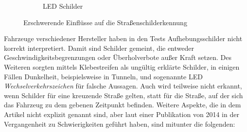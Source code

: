 \begin{figure}[H]
\begin{subfigure}[b]{0.125\textwidth}
    \caption{LED Schilder}
    \label{fig:ledschild}
   \end{subfigure}
      \caption{Erschwerende Einflüsse auf die Straßenschilderkennung}
      \label{fig:einfluesse-strscherkennung}
\end{figure}

Fahrzeuge verschiedener Hersteller haben in den Tests Aufhebungsschilder nicht korrekt interpretiert. Damit sind Schilder gemeint, die entweder Geschwindigkeitsbegrenzungen oder Überholverbote außer Kraft setzen. Des Weiteren sorgten mittels Klebestreifen als ungültig erklärte Schilder, in einigen Fällen Dunkelheit, beispielsweise in Tunneln, und sogenannte LED \emph{Wechselverkehrszeichen} für falsche Aussagen. Auch wird teilweise nicht erkannt, wenn Schilder für eine kreuzende Straße gelten, statt für die Straße, auf der sich das Fahrzeug zu dem gebenen Zeitpunkt befinden. Weitere Aspekte, die in dem Artikel nicht explizit genannt sind, aber laut einer Publikation von 2014 in der Vergangenheit zu Schwierigkeiten geführt haben, sind mitunter die folgenden: \cite{traffic-sign-detection-review-2014}

